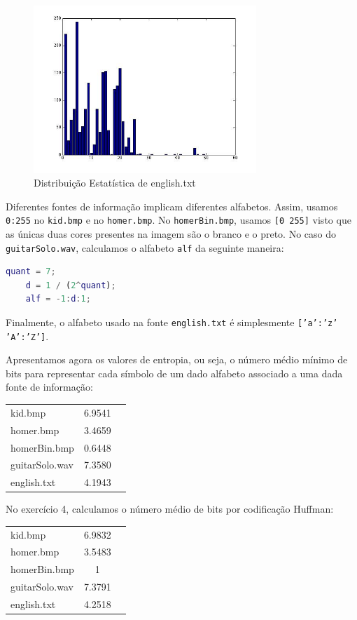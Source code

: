 \documentclass{article}
\begin{document}
  \begin{figure}[H]
    \centering
      \includegraphics[width=0.75\textwidth]{ex3english}
    \caption{Distribuição Estatística de english.txt}
  \end{figure}

  Diferentes fontes de informação implicam diferentes alfabetos. Assim, usamos
  \texttt{0:255} no \texttt{kid.bmp} e no \texttt{homer.bmp}. No \texttt{homerBin.bmp},
  usamos \texttt{[0 255]} visto que as únicas duas cores presentes na imagem
  são o branco e o preto. No caso do \texttt{guitarSolo.wav}, calculamos o alfabeto
  \texttt{alf} da seguinte maneira:

  \vspace{2mm}
  \begin{lstlisting}[language=Matlab]
    quant = 7;
    d = 1 / (2^quant);
    alf = -1:d:1;
  \end{lstlisting}

  Finalmente, o alfabeto usado na fonte \texttt{english.txt} é simplesmente
  \texttt{['a':'z' 'A':'Z']}.

  Apresentamos agora os valores de entropia, ou seja, o número médio mínimo
  de bits para representar cada símbolo de um dado alfabeto associado a uma
  dada fonte de informação:

  \begin{tabular}{ l c r }
    kid.bmp & 6.9541 \\
    homer.bmp & 3.4659 \\
    homerBin.bmp & 0.6448 \\
    guitarSolo.wav & 7.3580 \\
    english.txt & 4.1943 \\
  \end{tabular}

  \pagebreak

  No exercício 4, calculamos o número médio de bits por codificação Huffman:

  \begin{tabular}{ l c r }
    kid.bmp & 6.9832 \\
    homer.bmp & 3.5483 \\
    homerBin.bmp & 1 \\
    guitarSolo.wav & 7.3791 \\
    english.txt & 4.2518 \\
  \end{tabular}
\end{document}
